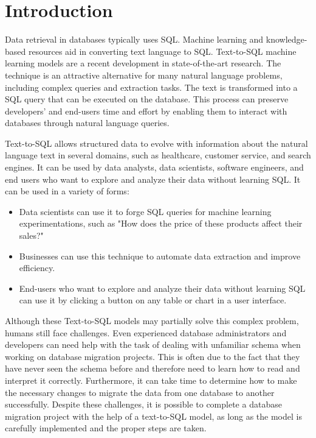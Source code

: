 \section{Introduction}

Data retrieval in databases typically uses \ac{SQL}. Machine learning and knowledge-based resources aid in converting text language to SQL. Text-to-SQL machine learning models are a recent development in state-of-the-art research. The technique is an attractive alternative for many natural language problems, including complex queries and extraction tasks. The text is transformed into a SQL query that can be executed on the database. This process can preserve developers' and end-users time and effort by enabling them to interact with databases through natural language queries.

Text-to-SQL allows structured data to evolve with information about the natural language text in several domains, such as healthcare, customer service, and search engines. It can be used by data analysts, data scientists, software engineers, and end users who want to explore and analyze their data without learning SQL. It can be used in a variety of forms:

\begin{itemize}
    \item Data scientists can use it to forge SQL queries for machine learning experimentations, such as "How does the price of these products affect their sales?"
    \item Businesses can use this technique to automate data extraction and improve efficiency.
    \item End-users who want to explore and analyze their data without learning SQL can use it by clicking a button on any table or chart in a user interface.
\end{itemize}

Although these Text-to-SQL models may partially solve this complex problem, humans still face challenges. Even experienced database administrators and developers can need help with the task of dealing with unfamiliar schema when working on database migration projects. This is often due to the fact that they have never seen the schema before and therefore need to learn how to read and interpret it correctly. Furthermore, it can take time to determine how to make the necessary changes to migrate the data from one database to another successfully. Despite these challenges, it is possible to complete a database migration project with the help of a text-to-SQL model, as long as the model is carefully implemented and the proper steps are taken.

